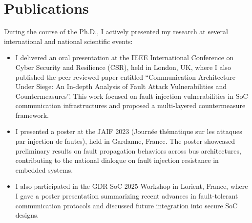\section*{Publications}

During the course of the Ph.D., I actively presented my research at several international and national scientific events:
\begin{itemize}
    \item I delivered an oral presentation at the IEEE International Conference on Cyber Security and Resilience (CSR), held in London, UK, where I also published the peer-reviewed paper entitled “Communication Architecture Under Siege: An In-depth Analysis of Fault Attack Vulnerabilities and Countermeasures”. This work focused on fault injection vulnerabilities in SoC communication infrastructures and proposed a multi-layered countermeasure framework.
    \item I presented a poster at the JAIF 2023 (Journée thématique sur les attaques par injection de fautes), held in Gardanne, France. The poster showcased preliminary results on fault propagation behaviors across bus architectures, contributing to the national dialogue on fault injection resistance in embedded systems.
    \item I also participated in the GDR SoC 2025 Workshop in Lorient, France, where I gave a poster presentation summarizing recent advances in fault-tolerant communication protocols and discussed future integration into secure SoC designs.
\end{itemize}






